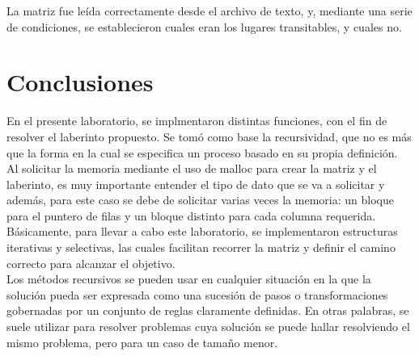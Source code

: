 \documentclass[
  letterpaper, 
  maincolor=black,
  sectioncolor=black!90,
  subsectioncolor=black!70,
  itemtextcolor=black!40,
]{fortysecondscv}
\begin{document}
La matriz fue leída correctamente desde el archivo de texto, y, mediante una serie de condiciones, se establecieron cuales eran los lugares transitables, y cuales no.\\

\section{Conclusiones}

En el presente laboratorio, se implmentaron distintas funciones, con el fin de resolver el laberinto propuesto. Se tomó como base la recursividad, que no es más que la forma en la cual se especifica un proceso basado en su propia definición.\\ 

Al solicitar la memoria mediante el uso de malloc para crear la matriz y el laberinto, es muy importante entender el tipo de dato que se va a solicitar y además, para este caso se debe de solicitar varias veces la memoria: un bloque para el puntero de filas y un bloque distinto para cada columna requerida.  \\

Básicamente, para llevar a cabo este laboratorio, se implementaron estructuras iterativas y selectivas, las cuales  facilitan recorrer la matriz y definir el camino correcto para alcanzar el objetivo. \\

Los métodos recursivos se pueden usar en cualquier situación en la que la solución pueda ser expresada como una sucesión de pasos o transformaciones gobernadas por un conjunto de reglas claramente definidas. En otras palabras, se suele utilizar  para resolver problemas cuya solución se puede hallar resolviendo el mismo problema, pero para un caso de tamaño menor.\\
\end{document}
